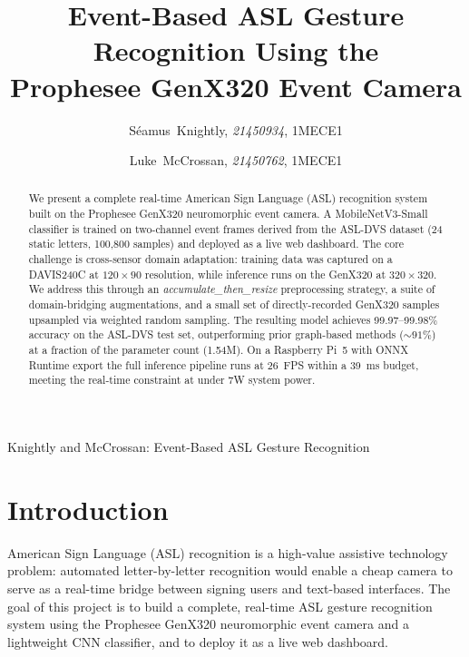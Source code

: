 \documentclass[journal]{IEEEtran}
\begin{document}
\title{Event-Based ASL Gesture Recognition Using the\\Prophesee GenX320 Event Camera}
\author{Séamus~Knightly, \textit{21450934}, 1MECE1 \and Luke~McCrossan, \textit{21450762}, 1MECE1}
%
{Knightly and McCrossan: Event-Based ASL Gesture Recognition}
\maketitle

\begin{abstract}
We present a complete real-time American Sign Language (ASL) recognition system built on the Prophesee GenX320 neuromorphic event camera. A MobileNetV3-Small classifier is trained on two-channel event frames derived from the ASL-DVS dataset (24 static letters, 100,800 samples) and deployed as a live web dashboard. The core challenge is cross-sensor domain adaptation: training data was captured on a DAVIS240C at $120{\times}90$ resolution, while inference runs on the GenX320 at $320{\times}320$. We address this through an \textit{accumulate\_then\_resize} preprocessing strategy, a suite of domain-bridging augmentations, and a small set of directly-recorded GenX320 samples upsampled via weighted random sampling. The resulting model achieves 99.97--99.98\% accuracy on the ASL-DVS test set, outperforming prior graph-based methods (${\sim}91\%$) at a fraction of the parameter count (1.54M). On a Raspberry Pi~5 with ONNX Runtime export the full inference pipeline runs at 26~FPS within a 39~ms budget, meeting the real-time constraint at under 7W system power.
\end{abstract}

\section{Introduction}

American Sign Language (ASL) recognition is a high-value assistive technology problem: automated letter-by-letter recognition would enable a cheap camera to serve as a real-time bridge between signing users and text-based interfaces. The goal of this project is to build a complete, real-time ASL gesture recognition system using the Prophesee GenX320 neuromorphic event camera and a lightweight CNN classifier, and to deploy it as a live web dashboard.
\end{document}
